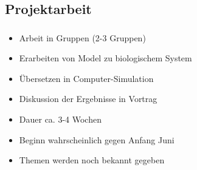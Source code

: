 \subsection{Projektarbeit}
\label{subsec:project}
\begin{frame}
    \frametitle{\insertsubsection}
    \begin{itemize}[<+->]
        \item Arbeit in Gruppen (2-3 Gruppen)
        \item Erarbeiten von Model zu biologischem System
        \item Übersetzen in Computer-Simulation
        \item Diskussion der Ergebnisse in Vortrag
        \item Dauer ca. 3-4 Wochen
        \item Beginn wahrscheinlich gegen Anfang Juni
        \item Themen werden noch bekannt gegeben
    \end{itemize}
\end{frame}

